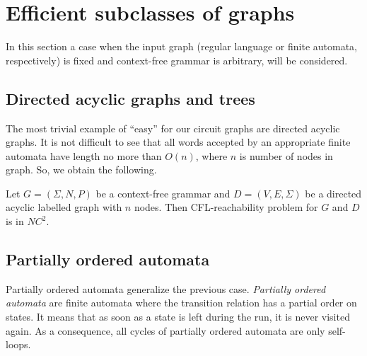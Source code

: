 \section{Efficient subclasses of graphs}
\label{sec:graph}
In this section a case when the input graph (regular language or finite automata, respectively) is fixed and context-free grammar is arbitrary, will be considered.
\subsection{Directed acyclic graphs and trees}
The most trivial example of ``easy'' for our circuit graphs are directed acyclic graphs. It is not difficult to see that all words accepted by an appropriate finite automata have length no more than $O(n)$, where $n$ is number of nodes in graph. So, we obtain the following.
\begin{corollary} 
Let  $G = (\Sigma, N, P)$ be a context-free grammar and $D=(V, E, \Sigma)$ be a directed acyclic labelled graph with $n$ nodes. Then CFL-reachability problem for $G$ and $D$ is in $NC^2$.
\end{corollary}
\subsection{Partially ordered automata}

Partially ordered automata generalize the previous case. \textit{Partially ordered automata} are finite automata where the transition relation has a partial
order on states. It means that as soon as a state is left during the run, it is never visited again.  As a consequence, all cycles of partially ordered automata are only self-loops.


